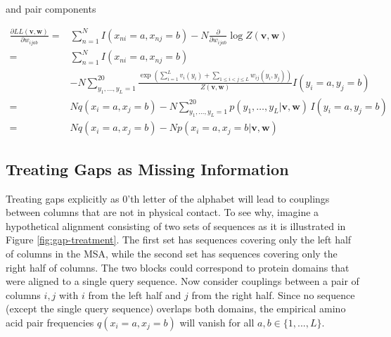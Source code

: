 \documentclass[11pt,a4paper,twoside]{book}
\newcommand{\eq}{\!=\!}
\newcommand{\LL}{L\!L(\mathbf{v}, \mathbf{w})}
\renewcommand{\v}{\mathbf{v}}
\newcommand{\w}{\mathbf{w}}
\newcommand{\wijab}{w_{ijab}}
\theoremstyle{definition}
\theoremstyle{definition}
\theoremstyle{remark}
\begin{document}
and pair components

\begin{align}
    \frac{\partial \LL}{\partial \wijab} =& \sum_{n=1}^N I(x_{ni}=a, x_{nj}=b)  - N \frac{\partial}{\partial \wijab} \log Z(\v,\w) \nonumber\\
                                        =& \sum_{n=1}^N I(x_{ni} \eq a, x_{nj} \eq b) \nonumber\\
                                        & - N \sum_{y_1,\ldots,y_L=1}^{20} \!\! \frac{ \exp \left( \sum_{i=1}^L v_i(y_i) + \sum_{1 \le i < j \le L} w_{ij}(y_i,y_j) \right)}{Z(\v,\w)}  I(y_i \eq a, y_j \eq b) \nonumber\\
                                        =&  N q(x_{i} \eq a, x_{j} \eq b) - N \sum_{y_1,\ldots,y_L=1}^{20} p(y_1, \ldots, y_L | \v,\w) \, I(y_i \eq a, y_j \eq b) \nonumber\\
                                        =&  N q(x_{i} \eq a, x_{j} \eq b) - N p(x_i \eq a, x_j \eq b | \v,\w) 
\label{eq:gradient-LL-pair}
\end{align}

\subsection{Treating Gaps as Missing Information}\label{gap-treatment}

Treating gaps explicitly as 0'th letter of the alphabet will lead to
couplings between columns that are not in physical contact. To see why,
imagine a hypothetical alignment consisting of two sets of sequences as
it is illustrated in Figure \ref{fig:gap-treatment}. The first set has
sequences covering only the left half of columns in the MSA, while the
second set has sequences covering only the right half of columns. The
two blocks could correspond to protein domains that were aligned to a
single query sequence. Now consider couplings between a pair of columns
\(i, j\) with \(i\) from the left half and \(j\) from the right half.
Since no sequence (except the single query sequence) overlaps both
domains, the empirical amino acid pair frequencies
\(q(x_i = a, x_j = b)\) will vanish for all \(a, b \in \{1,... , L\}\).
\end{document}
